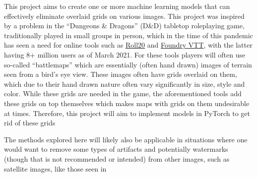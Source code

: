 This project aims to create one or more machine learning models that can effectively eliminate overlaid grids on various images. This project was inspired by a problem in the ``Dungeons \& Dragons'' (D\&D) tabletop roleplaying game, traditionally played in small groups in person, which in the time of this pandemic has seen a need for online tools such as \href{www.roll20.net}{Roll20} and \href{www.foundryvtt.com}{Foundry VTT}, with the latter having 8+ million users as of March 2021. For these tools players will often use so-called ``battlemaps'' which are essentially (often hand drawn) images of terrain seen from a bird's eye view. These images often have grids overlaid on them, which due to their hand drawn nature often vary significantly in size, style and color. While these grids are needed in the game, the aforementioned tools add these grids on top themselves which makes maps with grids on them undesirable at times. Therefore, this project will aim to implement models in PyTorch to get rid of these grids

The methods explored here will likely also be applicable in situations where one would want to remove some types of artifacts and potentially watermarks (though that is not recommended or intended) from other images, such as satellite images, like those seen in \cite{intro}
